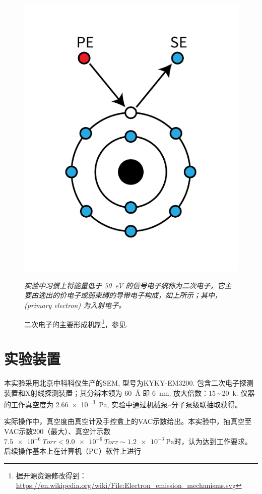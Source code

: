 \documentclass[aps,pre,12pt,preprint,%
	onecolumn,showpacs,showkeys,nofootinbib]{revtex4-1}
\begin{document}
	\begin{figure}[!h]
	\vspace{-3ex}
	\includegraphics[width=.35\linewidth]{SEmech.pdf}\vspace{-2ex}
	\caption[二次电子机制]{二次电子的主要形成机制\footnote{%
		据开源资源修改得到：
		\url{https://en.wikipedia.org/wiki/File:Electron_emission_mechanisms.svg}
	}，参见\cite{textbook}. }\vspace{1ex}
	\raggedright\small
	\textit{\hphantom{说明}%
		实验中习惯上将能量低于 \SI{50}{\eV} 的信号电子统称为二次电子，它主要由逸出的价电子或弱束缚的导带电子构成，如上所示；其中， (primary electron) 为入射电子。
	\vspace{1ex}}
	\label{fig:SEmech}
	\end{figure}
\section{实验装置}
	本实验采用北京中科科仪生产的SEM, 型号为KYKY-EM3200. 包含二次电子探测装置和X射线探测装置；其分辨本领为 \SI{60}{\angstrom} 即 \SI{6}{\nm}, 放大倍数：15\,\textasciitilde\,\SI{20}{k}. 仪器的工作真空度为 \SI{2.66e-3}{\Pa}, 实验中通过机械泵--分子泵级联抽取获得。
	
	实际操作中，真空度由真空计及手控盒上的VAC示数给出。本实验中，抽真空至VAC示数200（最大）、真空计示数$\SI{7.5e-6}{Torr} < \SI{9.0e-6}{Torr} \sim \SI{1.2e-3}{\Pa}$时，认为达到工作要求。后续操作基本上在计算机（PC）软件上进行
	
\end{document}
